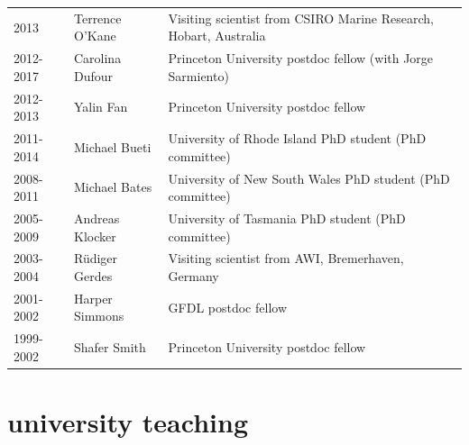 \documentclass{article}
\begin{document}
\begin{tabular}{lll}
2013               & Terrence O'Kane   & Visiting scientist from CSIRO Marine Research, Hobart, Australia \\

2012-2017     & Carolina Dufour   & Princeton University postdoc fellow (with Jorge Sarmiento)  \\

2012-2013     & Yalin Fan              & Princeton University postdoc fellow  \\

2011-2014     & Michael Bueti       & University of Rhode Island  PhD student (PhD committee) \\

2008-2011     & Michael Bates       & University of New South Wales PhD student (PhD committee) \\

2005-2009     & Andreas Klocker   & University of Tasmania  PhD student (PhD committee) \\

2003-2004     & {R\"{u}diger} Gerdes  & Visiting scientist from AWI, Bremerhaven, Germany \\

2001-2002     & Harper Simmons   & GFDL postdoc fellow \\

1999-2002     & Shafer Smith         & Princeton University postdoc fellow    
\end{tabular}

\section*{\sc  \color{Maroon}  university teaching}
\vspace{-.3cm}
\end{document}

